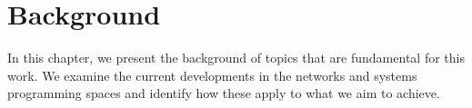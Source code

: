 \chapter{Background}

In this chapter, we present the background of topics that are fundamental for this work.
We examine the current developments in the networks and systems programming spaces and identify how these apply to what we aim to achieve.




